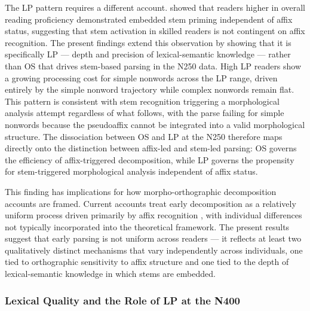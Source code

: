 \documentclass[utf8]{FrontiersinHarvard} %
\begin{document}
	The LP pattern requires a different account. \citet{beyersmannEmbeddedStemPriming2016} showed that readers higher in overall reading proficiency demonstrated embedded stem priming independent of affix status, suggesting that stem activation in skilled readers is not contingent on affix recognition. The present findings extend this observation by showing that it is specifically LP --- depth and precision of lexical-semantic knowledge --- rather than OS that drives stem-based parsing in the N250 data. High LP readers show a growing processing cost for simple nonwords across the LP range, driven entirely by the simple nonword trajectory while complex nonwords remain flat. This pattern is consistent with stem recognition triggering a morphological analysis attempt regardless of what follows, with the parse failing for simple nonwords because the pseudoaffix cannot be integrated into a valid morphological structure. The dissociation between OS and LP at the N250 therefore maps directly onto the distinction between affix-led and stem-led parsing: OS governs the efficiency of affix-triggered decomposition, while LP governs the propensity for stem-triggered morphological analysis independent of affix status.
	
	This finding has implications for how morpho-orthographic decomposition accounts are framed. Current accounts treat early decomposition as a relatively uniform process driven primarily by affix recognition \citep{rastleMorphologicalDecompositionBased2008}, with individual differences not typically incorporated into the theoretical framework. The present results suggest that early parsing is not uniform across readers --- it reflects at least two qualitatively distinct mechanisms that vary independently across individuals, one tied to orthographic sensitivity to affix structure and one tied to the depth of lexical-semantic knowledge in which stems are embedded.
	
	\subsubsection{Lexical Quality and the Role of LP at the N400}
	
\end{document}
